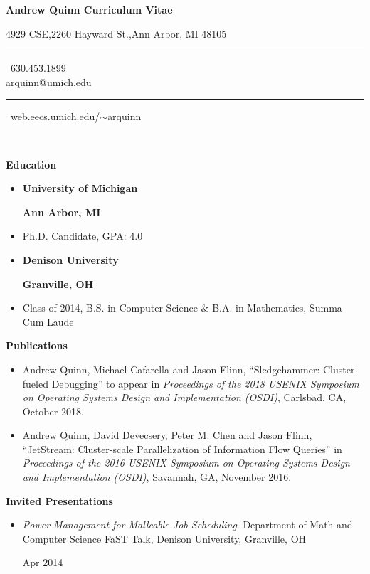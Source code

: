 \documentclass[letterpaper,11pt]{article}
\makeatletter
\def \name {Andrew Quinn Curriculum Vitae}
\def \officeaddr {4929 CSE,2260 Hayward St.,Ann Arbor, MI 48105}
\def \phone {630.453.1899}
\def \email {arquinn@umich.edu}
\def \website {web.eecs.umich.edu/$\sim$arquinn}
\newlength \firstcol
\newcommand{\resheading}[1]{{\large \colorbox{mygrey}{\begin{minipage}{\textwidth}{\textbf{#1\vphantom{p\^{E}}}}\end{minipage}}}}
\newcommand{\reitem}[2]{
\begin{minipage}[t]{\firstcol}
#2
\end{minipage}
\null\hfill
\begin{minipage}[t]{4cm}
\flushright
#1
\end{minipage}
}
\newcommand{\heading}[4]{
\vspace{#1}
\begin{minipage}{8cm}
\flushleft
\textbf{#2}
\end{minipage}
\null\hfill
\begin{minipage}{7cm}
\flushright 
\textbf{#3}
\end{minipage}
\vspace{#4}
}
\newcommand{\blkSquare}{\ \rule[.2ex]{1ex}{1ex}\ }
\newcommand{\myTitle}{
\textbf{{\LARGE \name}} \\
{\footnotesize \officeaddr \blkSquare \phone \\ \email \blkSquare \website} \\
\vspace{0.1in}}
\makeatother
\begin{document}
\myTitle %

\resheading{Education}
\begin{itemize}
	\item[] \heading{0em}{University of Michigan}{Ann Arbor, MI}{.25em}
	\item[] Ph.D. Candidate, GPA: 4.0
	\item[] \heading{0em}{Denison University}{Granville,
          OH}{.25em}
	\item[]  Class of 2014, B.S. in Computer Science \& B.A. in Mathematics, Summa Cum Laude
\end{itemize}

\resheading{Publications}
\begin{itemize}
\item[] Andrew Quinn, Michael Cafarella and Jason Flinn, ``Sledgehammer: Cluster-fueled Debugging'' to appear in \emph{Proceedings of the 2018 USENIX Symposium on Operating Systems Design and Implementation (OSDI)}, Carlsbad, CA, October 2018.
\item[] Andrew Quinn, David Devecsery, Peter M. Chen and Jason Flinn, ``JetStream: Cluster-scale Parallelization of Information Flow Queries'' in \emph{Proceedings of the 2016 USENIX Symposium on Operating Systems Design and Implementation (OSDI)}, Savannah, GA, November 2016.
\end{itemize}

\resheading{Invited Presentations}
\begin{itemize}
\item[] \reitem{Apr 2014}{\emph{Power Management for Malleable Job Scheduling}. Department of Math and Computer Science FaST Talk, Denison University, Granville, OH}
\end{itemize}
\end{document}
